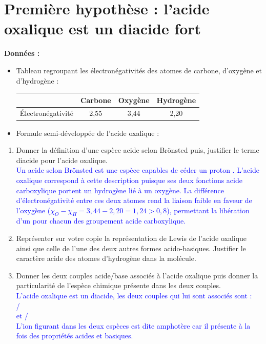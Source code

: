 \documentclass[a4paper,11pt]{article}
\begin{document}
\section{Première hypothèse : l'acide oxalique est un diacide fort}
\textbf{Données :}
\begin{itemize}
    \item Tableau regroupant les électronégativités des atomes de carbone, d'oxygène et d'hydrogène :\\
    \begin{tabular}{|c|c|c|c|}
    \hline & Carbone & Oxygène & Hydrogène  \\
    \hline Électronégativité & 2,55 & 3,44 & 2,20\\
    \hline
    \end{tabular}
    \item Formule semi-développée de l'acide oxalique :\\
    \begin{center} 
    \end{center}
\end{itemize}
\begin{enumerate}
    \item Donner la définition d'une espèce acide selon Brönsted puis, justifier le terme diacide pour l'acide oxalique.\\
    \textcolor{blue}{Un acide selon Brönsted est une espèce capables de céder un proton . L'acide oxalique correspond à cette description puisque ses deux fonctions acide carboxylique portent un hydrogène lié à un oxygène. La différence d'électronégativité entre ces deux atomes rend la liaison faible en faveur de l'oxygène ($\chi_O - \chi_H = 3,44 - 2,20 = 1,24 >0,8$), permettant la libération d'un  pour chacun des groupement acide carboxylique.}
    \item Représenter sur votre copie la représentation de Lewis de l'acide oxalique ainsi que celle de l'une des deux autres formes acido-basiques. Justifier le caractère acide des atomes d'hydrogène dans la molécule.
    \item Donner les deux couples acide/base associés à l'acide oxalique puis donner la particularité de l'espèce chimique présente dans les deux couples.\\
    \textcolor{blue}{L'acide oxalique est un diacide, les deux couples qui lui sont associés sont : \\/ \\ et /\\
    L'ion  figurant dans les deux espèces est dite amphotère car il présente à la fois des propriétés acides et basiques.}
\end{enumerate}
\end{document}
